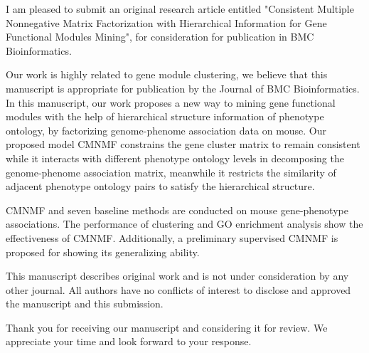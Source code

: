 \documentclass[10pt,stdletter,dateno,sigleft]{newlfm} %
\begin{document}
\begin{newlfm}

I am pleased to submit an original research article entitled "Consistent Multiple Nonnegative Matrix Factorization with Hierarchical Information for Gene Functional Modules Mining", for consideration for publication in BMC Bioinformatics.

Our work is highly related to gene module clustering, we believe that this manuscript is appropriate for publication by the Journal of BMC Bioinformatics. In this manuscript, our work proposes a new way to mining gene functional modules with the help of hierarchical structure information of phenotype ontology, by factorizing genome-phenome association data on mouse. Our proposed model CMNMF constrains the gene cluster matrix to remain consistent while it interacts with different phenotype ontology levels in decomposing the genome-phenome association matrix, meanwhile it restricts the similarity of adjacent phenotype ontology pairs to satisfy the hierarchical structure.

CMNMF and seven baseline methods are conducted on mouse gene-phenotype associations. The performance of clustering and GO enrichment analysis show the effectiveness of CMNMF. Additionally, a preliminary supervised CMNMF is proposed for showing its generalizing ability.

This manuscript describes original work and is not under consideration by any other journal. All authors have no conflicts of interest to disclose and approved the manuscript and this submission.

Thank you for receiving our manuscript and considering it for review. We appreciate your time and look forward to your response.
\end{newlfm}
\end{document}
